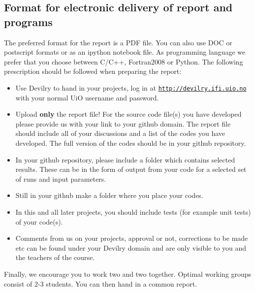 \documentclass[%
oneside,                 %
final,                   %
10pt]{article}
\begin{document}
\noindent
\subsection{Format for electronic delivery of report and programs}

The preferred format for the report is a PDF file. You can also use DOC or postscript formats or as an ipython notebook file.  As programming language we prefer that you choose between C/C++, Fortran2008 or Python. The following prescription should be followed when preparing the report:

\begin{itemize}
  \item Use Devilry to hand in your projects, log in  at  \href{{http://devilry.ifi.uio.no}}{\nolinkurl{http://devilry.ifi.uio.no}} with your normal UiO username and password.

  \item Upload \textbf{only} the report file!  For the source code file(s) you have developed please provide us with your link to your github domain.  The report file should include all of your discussions and a list of the codes you have developed.  The full version of the codes should be in your github repository.

  \item In your github repository, please include a folder which contains selected results. These can be in the form of output from your code for a selected set of runs and input parameters.

  \item Still in your github make a folder where you place your codes. 

  \item In this and all later projects, you should include tests (for example unit tests) of your code(s).

  \item Comments  from us on your projects, approval or not, corrections to be made  etc can be found under your Devilry domain and are only visible to you and the teachers of the course.
\end{itemize}

\noindent
Finally, 
we encourage you to work two and two together. Optimal working groups consist of 
2-3 students. You can then hand in a common report. 



\end{document}
